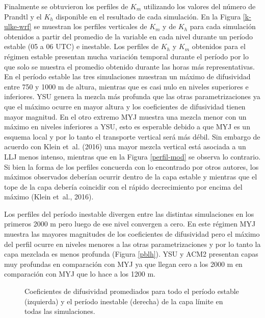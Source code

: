 \documentclass[12pt,spanish,oneside, a4paper]{book}
\begin{document}
Finalmente se obtuvieron los perfiles de \(K_m\) utilizando los valores
del número de Prandtl y el \(K_h\) disponible en el resultado de cada
simulación. En la Figura \ref{k-ulke-wrf} se muestran los perfiles
verticales de \(K_m\) y de \(K_h\) para cada simulación obtenidos a
partir del promedio de la variable en cada nivel durante un período
estable (05 a 06 UTC) e inestable. Los perfiles de \(K_h\) y \(K_m\)
obtenidos para el régimen estable presentan mucha variación temporal
durante el período por lo que solo se muestra el promedio obtenido
durante las horas más representativas. En el período estable las tres
simulaciones muestran un máximo de difusividad entre 750 y 1000 m de
altura, mientras que es casi nulo en niveles superiores e inferiores.
YSU genera la mezcla más profunda que las otras parametrizaciones ya que
el máximo ocurre en mayor altura y los coeficientes de difusividad
tienen mayor magnitud. En el otro extremo MYJ muestra una mezcla menor
con un máximo en niveles inferiores a YSU, esto es esperable debido a
que MYJ es un esquema local y por lo tanto el transporte vertical será
más débil. Sin embargo de acuerdo con Klein et~al. (2016) una mayor
mezcla vertical está asociada a un LLJ menos intenso, mientras que en la
Figura \ref{perfil-mod} se observa lo contrario. Si bien la forma de los
perfiles concuerda con lo encontrado por otros autores, los máximos
observados deberían ocurrir dentro de la capa estable y mientras que el
tope de la capa debería coincidir con el rápido decrecimiento por encima
del máximo (Klein et~al., 2016).

Los perfiles del período inestable divergen entre las distintas
simulaciones en los primeros 2000 m pero luego de ese nivel convergen a
cero. En este régimen MYJ muestra las mayores magnitudes de los
coeficientes de difusividad pero el máximo del perfil ocurre en niveles
menores a las otras parametrizaciones y por lo tanto la capa mezclada es
menos profunda (Figura \ref{pblh}). YSU y ACM2 presentan capas muy
profundas en comparación con MYJ ya que llegan cero a los 2000 m en
comparación con MYJ que lo hace a los 1200 m.

\begin{figure}

{\centering {}\newline{}

}

\caption{Coeficientes de difusividad promediados para todo el período estable (izquierda) y el período inestable (derecha) de la capa límite en todas las simulaciones. \label{k-ulke-wrf}}\label{fig:k_ulke_wrf}
\end{figure}
\end{document}
